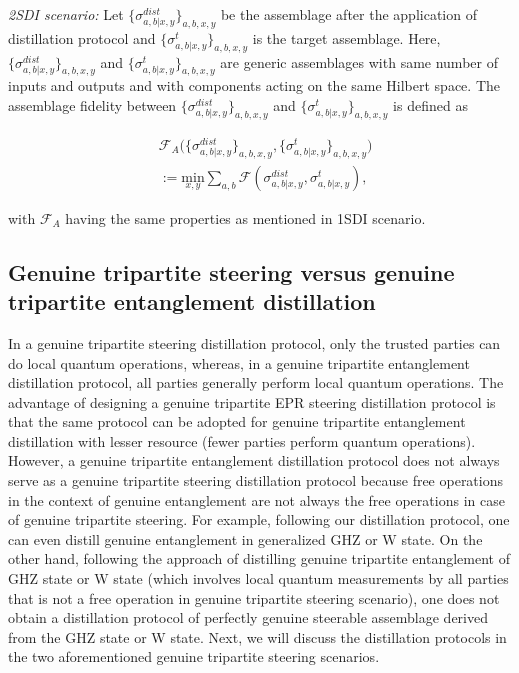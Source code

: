 \documentclass[reprint,superscriptaddress,nofootinbib,amsmath,amssymb,aps,pra,longbibliography]{revtex4-1}
\begin{document}
\textit{2SDI scenario:} Let $\{\sigma_{a,b|x, y}^{dist}\}_{a,b,x,y}$ be the assemblage after the application of distillation protocol and $\{\sigma_{a,b|x,y}^{t}\}_{a,b,x,y}$ is the target assemblage. Here, $\{\sigma_{a,b|x, y}^{dist}\}_{a,b,x,y}$ and $\{\sigma_{a,b|x,y}^{t}\}_{a,b,x,y}$ are generic assemblages with same number of inputs and outputs and with components acting on the same Hilbert space. The assemblage fidelity between $\{\sigma_{a,b|x, y}^{dist}\}_{a,b,x,y}$ and $\{\sigma_{a,b|x,y}^{t}\}_{a,b,x,y}$ is defined as 

\begin{align}
	& \mathcal{F}_A \Big(\{\sigma_{a,b|x, y}^{dist}\}_{a,b,x,y}, \{\sigma_{a,b|x,y}^{t}\}_{a,b,x,y} \Big) \nonumber \\
	&:= \underset{x,y}{\mathrm{min}}\sum_{a,b} \mathcal{F}(\sigma_{a,b|x,y}^{dist}, \sigma_{a,b|x,y}^{t}),
\end{align}

with $\mathcal{F}_A$ having the same properties as mentioned in 1SDI scenario. 

\subsection{Genuine tripartite steering versus genuine tripartite entanglement distillation}
In a genuine tripartite steering distillation protocol, only the trusted parties can do local quantum operations, whereas, in a genuine tripartite entanglement distillation protocol, all parties generally perform local quantum operations. The advantage of designing a genuine tripartite EPR steering distillation protocol is that the same protocol can be adopted for genuine tripartite entanglement distillation with lesser resource (fewer parties perform quantum  operations). However, a genuine tripartite entanglement distillation protocol does not always serve as a genuine tripartite steering distillation protocol because free operations in the context of genuine entanglement are not always the free operations in case of genuine tripartite steering. For example, following our distillation protocol, one can even distill genuine entanglement in generalized GHZ or W state. On the other hand, following the approach of distilling genuine tripartite entanglement of GHZ state or W state (which involves local quantum measurements by all parties that is not a free operation in genuine tripartite steering scenario), one does not obtain a distillation protocol of perfectly genuine steerable assemblage derived from the GHZ state or W state. Next, we will discuss the distillation protocols in the two aforementioned genuine tripartite steering scenarios.
\end{document}

